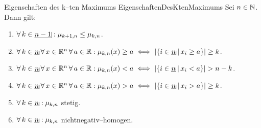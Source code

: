 \begin{lemma}{Eigenschaften des k--ten Maximums}
             {EigenschaftenDesKtenMaximums}
Sei $n \in \mathbb{N}$.\\
Dann gilt:
\begin{enumerate}[(1)]
	\item \label{EigenschaftenDesKtenMaximums1}
	$\forall\, k \in \haken {n-1}: \mu_{k+1,n} \le \mu_{k,n}$.
	\item \label{EigenschaftenDesKtenMaximums2}
	$\forall\, k \in \haken n\, \forall\, x \in \R^n\, \forall\,a \in \R:
	\mu_{k,n}(x) \ge a \iff \abs{\menge{i \in \haken n}{x_i \ge a}} \ge k$.
	\item\label{EigenschaftenDesKtenMaximums2a}
	$\forall\, k \in \haken n\, \forall\, x \in \R^n\, \forall\,a \in \R:
	\mu_{k,n}(x) < a \iff \abs{\menge{i \in \haken n}{x_i < a}} > n - k$.
	\item\label{EigenschaftenDesKtenMaximums2b}
	$\forall\, k \in \haken n\, \forall\, x \in \R^n\, \forall\,a \in \R:
	\mu_{k,n}(x) > a \iff \abs{\menge{i \in \haken n}{x_i > a}} \ge k$.
	\item\label{EigenschaftenDesKtenMaximums2c}
	$\forall\, k \in \haken n: \mu_{k, n}$ stetig.
	\item \label{EigenschaftenDesKtenMaximums3}
	$\forall\, k \in \haken n: \mu_{k, n}$ nichtnegativ--homogen.
\end{enumerate}
\end{lemma}
